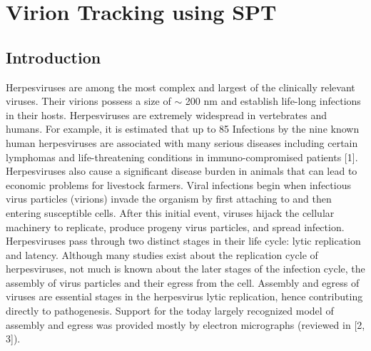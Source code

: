 \section{Virion Tracking using SPT}


\subsection{Introduction}
Herpesviruses are among the most complex and largest of the clinically relevant viruses.
Their virions possess a size of $\sim$ 200 nm and establish life-long infections in their hosts.
Herpesviruses are extremely widespread in vertebrates and humans.
For example, it is estimated that up to 85%
Infections by the nine known human herpesviruses are associated with many serious diseases including certain lymphomas and life-threatening conditions in immuno-compromised patients [1].
Herpesviruses also cause a significant disease burden in animals that can lead to economic problems for livestock farmers.
Viral infections begin when infectious virus particles (virions) invade the organism by first attaching to and then entering susceptible cells.
After this initial event, viruses hijack the cellular machinery to replicate, produce progeny virus particles, and spread infection.
Herpesviruses pass through two distinct stages in their life cycle: lytic replication and latency.
Although many studies exist about the replication cycle of herpesviruses, not much is known about the later stages of the infection cycle, the assembly of virus particles and their egress from the cell.
Assembly and egress of viruses are essential stages in the herpesvirus lytic replication, hence contributing directly to pathogenesis.
Support for the today largely recognized model of assembly and egress was provided mostly by electron micrographs (reviewed in [2, 3]).

